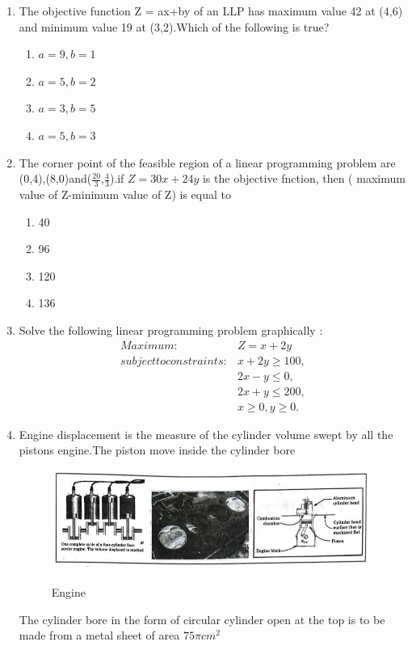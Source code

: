 \documentclass{article}
\begin{document}
\begin{enumerate}
	\item The objective function Z = ax+by of an LLP has maximum value 42 at (4,6) and minimum value 19 at (3,2).Which of the following is true?
		
  		\begin{enumerate}
				\item $a=9,b=1$
		        	\item $a=5,b=2$
				\item $a= 3,b=5$
				\item $a=5,b=3$
			
		\end{enumerate}
		
	\item The corner point of the feasible region of a linear programming problem are (0,4),(8,0)and($\frac{20}{3}$,$\frac{4}{3}$).if $ Z=30x+24y $ is the objective fnction, then ( maximum value of Z-minimum value of Z) is equal to 
		
		\begin{enumerate}
				\item 40
				\item 96
				\item 120
				\item 136
		\end{enumerate}
		
		
	\item 
	 Solve the following linear programming problem graphically :
\begin{align}
	Maximum:& Z=x+2y \nonumber \\
	subject to constraints 
	     :& x+2y\ge100,\nonumber\\
             & 2x-y\le0,\nonumber\\
	     & 2x+y\le200,\nonumber\\
   	     & x\ge0,y\ge0.\nonumber
\end{align}
				

			      \item
		Engine displacement is the measure of the cylinder volume swept by all the pistons engine.The piston move inside the cylinder bore \\
		
		\begin{figure}[htbp]
	\includegraphics[width=1 \columnwidth]{engine.jpg}\\
			\caption{Engine}
			\label{fig:pic}  \end{figure}
		The cylinder bore in the form of circular cylinder open at the top is to be made from a metal sheet of area $ 75 \pi cm^2 $ \\
 	

\end{enumerate}
\end{document}

